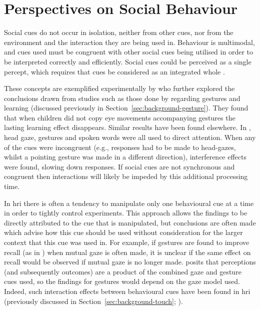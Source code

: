 \section{Perspectives on Social Behaviour} \label{sec:background-sync}
Social cues do not occur in isolation, neither from other cues, nor from the environment and the interaction they are being used in. Behaviour is multimodal, and cues used must be congruent with other social cues being utilised in order to be interpreted correctly and efficiently. Social cues could be perceived as a single percept, which requires that cues be considered as an integrated whole \citep{zaki2013cue}. 

These concepts are exemplified experimentally by \cite{byrd2014gesturing} who further explored the conclusions drawn from studies such as those done by \cite{cook2008gesturing} regarding gestures and learning (discussed previously in Section~\ref{sec:background-gesture}). They found that when children did not copy eye movements accompanying gestures the lasting learning effect disappears. Similar results have been found elsewhere. In  \cite{langton2000mutual, langton2000you}, head gaze, gestures and spoken words were all used to direct attention. When any of the cues were incongruent (e.g., responses had to be made to head-gazes, whilst a pointing gesture was made in a different direction), interference effects were found, slowing down responses. If social cues are not synchronous and congruent then interactions will likely be impeded by this additional processing time.

In \acrshort{hri} there is often a tendency to manipulate only one behavioural cue at a time in order to tightly control experiments. This approach allows the findings to be directly attributed to the cue that is manipulated, but conclusions are often made which advise how this cue should be used without consideration for the larger context that this cue was used in. For example, if gestures are found to improve recall (as in \citealp{szafir2012pay}) when mutual gaze is often made, it is unclear if the same effect on recall would be observed if mutual gaze is no longer made. \cite{zaki2013cue} posits that perceptions (and subsequently outcomes) are a product of the combined gaze and gesture cues used, so the findings for gestures would depend on the gaze model used. Indeed, such interaction effects between behavioural cues have been found in \acrshort{hri} (previously discussed in Section~\ref{sec:background-touch}; \citealp{chen2011touched,cramer2009hug}).


